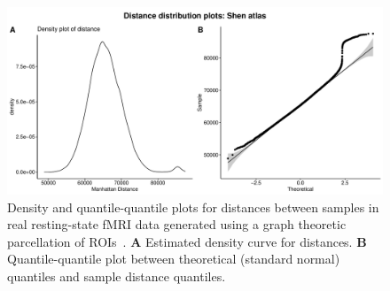 \documentclass[10pt,letterpaper]{article}\usepackage[]{graphicx}\usepackage[]{color}
\begin{document}
\begin{figure}[H]
	\includegraphics[width=\textwidth]{manhattan-distance_hist_shen-atlas.pdf}
	\caption{Density and quantile-quantile plots for distances between samples in real resting-state fMRI data generated using a graph theoretic parcellation of ROIs~\cite{shen2013}. \textbf{A} Estimated density curve for distances. \textbf{B} Quantile-quantile plot between theoretical (standard normal) quantiles and sample distance quantiles.}
\end{figure}


\end{document}
